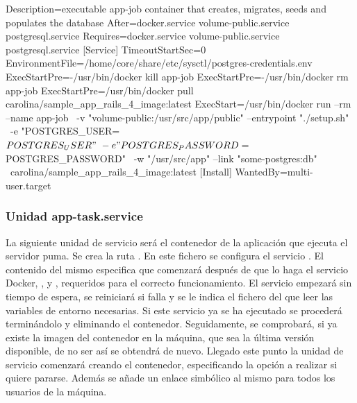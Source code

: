 \begin{codelisting}
\label{code:app-job.service}
\begin{code}
[Unit] 
  Description=executable app-job container that creates, migrates, seeds and 
              populates the database
  After=docker.service volume-public.service postgresql.service
  Requires=docker.service volume-public.service postgresql.service
[Service] 
  TimeoutStartSec=0 
  EnvironmentFile=/home/core/share/etc/sysctl/postgres-credentials.env
  ExecStartPre=-/usr/bin/docker kill app-job 
  ExecStartPre=-/usr/bin/docker rm app-job 
  ExecStartPre=/usr/bin/docker pull carolina/sample_app_rails_4_image:latest 
  ExecStart=/usr/bin/docker run --rm --name app-job \
  -v "volume-public:/usr/src/app/public" --entrypoint "./setup.sh" \
  -e "POSTGRES_USER=${POSTGRES_USER}" \
  -e "POSTGRES_PASSWORD=${POSTGRES_PASSWORD}" \
  -w "/usr/src/app" --link "some-postgres:db" \
  carolina/sample_app_rails_4_image:latest
[Install] 
  WantedBy=multi-user.target
\end{code}
\end{codelisting}

\subsubsection{Unidad app-task.service}

La siguiente unidad de servicio será el contenedor de la aplicación que ejecuta el servidor puma. Se crea la ruta . En este fichero se configura el servicio . El contenido del mismo especifica que comenzará después de que lo haga el servicio Docker, ,  y , requeridos para el correcto funcionamiento. El servicio empezará  sin tiempo de espera, se reiniciará si falla y se le indica el fichero del que leer las variables de entorno necesarias. Si este servicio ya se ha ejecutado se procederá terminándolo y eliminando el contenedor. Seguidamente, se comprobará, si ya existe la imagen del contenedor en la máquina, que sea la última versión disponible, de no ser así se obtendrá de nuevo. Llegado este punto la unidad de servicio comenzará creando el contenedor, especificando la opción a realizar si quiere pararse. Además se añade un enlace simbólico al mismo para todos los usuarios de la máquina. 

